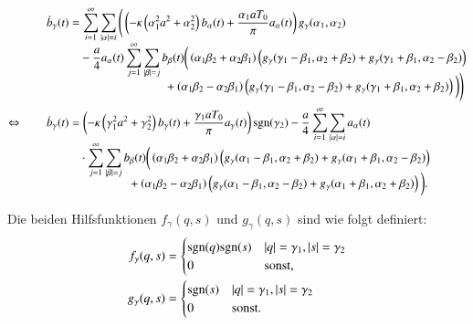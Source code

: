 \begin{align}
\dot{b}_\gamma(t)
&=
\sum_{i = 1}^{\infty}
\sum_{|\alpha| = i}
\Bigg(
\left(
-
\kappa
\left(\alpha_1^2 a^2 + \alpha_2^2\right)
b_{\alpha}(t)
+
\frac{\alpha_1 a T_0}{\pi}
a_{\alpha}(t)
\right)
g_\gamma(\alpha_1, \alpha_2) 
\nonumber
\\[-1ex]
&\phantom{={}}
-
\frac{a}{4}
a_{\alpha}(t)
\sum_{j = 1}^{\infty}
\sum_{|\beta| = j}
b_{\beta}(t)
\bigg(
\left(\alpha_1 \beta_2 + \alpha_2 \beta_1 \right)
\left(
g_\gamma(\gamma_1 - \beta_1, \alpha_2 + \beta_2)
+
g_\gamma(\gamma_1 + \beta_1, \alpha_2 - \beta_2)
\right) \nonumber
\\[-2ex]
&\phantom{=-aat\sum\sum...{}ccc}
+
\left(\alpha_1 \beta_2 - \alpha_2 \beta_1 \right)
\left(
g_\gamma(\gamma_1 - \beta_1, \alpha_2 - \beta_2)
+
g_\gamma(\gamma_1 + \beta_1, \alpha_2 + \beta_2)
\right)
\bigg)
\Bigg) \nonumber
\\
\Leftrightarrow \qquad
\dot{b}_\gamma(t)
&=
\left(
-
\kappa
\left(\gamma_1^2 a^2 + \gamma_2^2\right)
b_{\gamma}(t)
+
\frac{\gamma_1 a T_0}{\pi}
a_{\gamma}(t)
\right)
\sgn(\gamma_2)
-
\frac{a}{4}
\sum_{i = 1}^{\infty}
\sum_{|\alpha| = i}
a_{\alpha}(t)
\nonumber
\\[-1ex]
&\phantom{={}}
\cdot
\sum_{j = 1}^{\infty}
\sum_{|\beta| = j}
b_{\beta}(t)
\bigg(
\left(\alpha_1 \beta_2 + \alpha_2 \beta_1 \right)
\left(
g_\gamma(\alpha_1 - \beta_1, \alpha_2 + \beta_2)
+
g_\gamma(\alpha_1 + \beta_1, \alpha_2 - \beta_2)
\right)
\nonumber
\\[-2ex]
&\phantom{=-aat\sum..}
+
\left(\alpha_1 \beta_2 - \alpha_2 \beta_1 \right)
\left(
g_\gamma(\alpha_1 - \beta_1, \alpha_2 - \beta_2)
+
g_\gamma(\alpha_1 + \beta_1, \alpha_2 + \beta_2)
\right)
\bigg).
\label{equation:lorenz2:dotb}
\end{align}

Die beiden Hilfsfunktionen $f_\gamma(q, s)$ und $g_\gamma(q, s)$ sind wie folgt 
definiert:
\begin{align*}
f_\gamma(q, s)
&=
\begin{cases}
\sgn(q)\sgn(s) & |q| = \gamma_1, |s| = \gamma_2 \\
0 & \text{sonst,}
\end{cases}
\\
g_\gamma(q, s)
&=
\begin{cases}
\sgn(s) & |q| = \gamma_1, |s| = \gamma_2 \\
0 & \text{sonst}.
\end{cases}
\end{align*}
